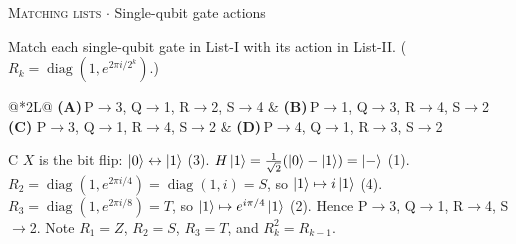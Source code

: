 \documentclass[11pt,a4paper]{article}
\newcommand{\optlabel}[1]{\textbf{(#1)}}
\newcommand{\correctlabel}[1]{\textcolor{okgreen}{\textbf{(#1)}\,\ding{51}}}
\newenvironment{qitem}[1]{\begin{list}{}{\setlength{\leftmargin}{3.3em}\setlength{\labelwidth}{3.1em}%
  \setlength{\labelsep}{0.2em}\setlength{\topsep}{3pt}\setlength{\parsep}{3pt}}\item[\textbf{Q.#1}\hfill]}{\end{list}}
\newcommand{\qsep}{\par\vspace{2pt}{\color{black!15}\hrule}\vspace{4pt}}
\newcommand{\qmeta}[2]{{\footnotesize\color{black!60}\textsc{#1} \;$\cdot$\; #2}\par}
\begin{document}
\begin{qitem}{35}
\qmeta{Matching lists}{Single-qubit gate actions}
Match each single-qubit gate in List-I with its action in List-II. ($R_k = \operatorname{diag}(1, e^{2\pi i/2^k})$.)
\par\smallskip{}
\par\smallskip\noindent\begin{tabularx}{\linewidth}{@{}*{2}{L}@{}}
\optlabel{A}\,P$\to$3, Q$\to$1, R$\to$2, S$\to$4 & \optlabel{B}\,P$\to$1, Q$\to$3, R$\to$4, S$\to$2 \\[3pt]
\correctlabel{C}\,P$\to$3, Q$\to$1, R$\to$4, S$\to$2 & \optlabel{D}\,P$\to$4, Q$\to$1, R$\to$3, S$\to$2
\end{tabularx}
\end{qitem}
\begin{solbox}{C}
$X$ is the bit flip: $\ket0 \leftrightarrow \ket1$ (3). $H\ket1 = \frac{1}{\sqrt2}(\ket0 - \ket1) = \ket{-}$ (1).
$R_2 = \operatorname{diag}(1, e^{2\pi i/4}) = \operatorname{diag}(1, i) = S$, so $\ket1 \mapsto i\ket1$ (4).
$R_3 = \operatorname{diag}(1, e^{2\pi i/8}) = T$, so $\ket1 \mapsto e^{i\pi/4}\ket1$ (2).
Hence P$\to$3, Q$\to$1, R$\to$4, S$\to$2. Note $R_1 = Z$, $R_2 = S$, $R_3 = T$, and $R_{k}^{2} = R_{k-1}$.
\end{solbox}
\qsep
\end{document}
